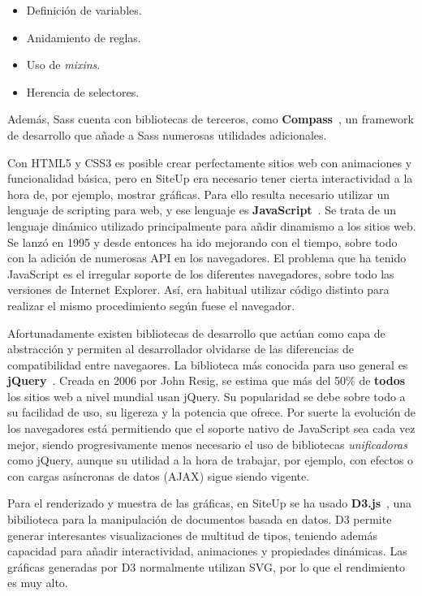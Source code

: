 \begin{itemize}
\item Definición de variables.
\item Anidamiento de reglas.
\item Uso de \textit{mixins}.
\item Herencia de selectores.
\end{itemize}

Además, Sass cuenta con bibliotecas de terceros, como
\textbf{Compass}~\cite{compass}, un framework de desarrollo que añade a Sass
numerosas utilidades adicionales.

Con HTML5 y CSS3 es posible crear perfectamente sitios web con animaciones y
funcionalidad básica, pero en SiteUp era necesario tener cierta interactividad a
la hora de, por ejemplo, mostrar gráficas. Para ello resulta necesario utilizar
un lenguaje de scripting para web, y ese lenguaje es
\textbf{JavaScript}~\cite{javascript}. Se trata de un lenguaje dinámico
utilizado principalmente para añdir dinamismo a los sitios web. Se lanzó en 1995
y desde entonces ha ido mejorando con el tiempo, sobre todo con la adición de
numerosas \ac{API} en los navegadores. El problema que ha tenido JavaScript es
el irregular soporte de los diferentes navegadores, sobre todo las versiones de
Internet Explorer. Así, era habitual utilizar código distinto para realizar el
mismo procedimiento según fuese el navegador.

Afortunadamente existen bibliotecas de desarrollo que actúan como capa de
abstracción y permiten al desarrollador olvidarse de las diferencias de
compatibilidad entre navegaores. La biblioteca más conocida para uso general es
\textbf{jQuery}~\cite{jquery}. Creada en 2006 por John Resig, se estima que más
del 50\% de \textbf{todos} los sitios web a nivel mundial usan jQuery. Su
popularidad se debe sobre todo a su facilidad de uso, su ligereza y la potencia
que ofrece. Por suerte la evolución de los navegadores está permitiendo
que el soporte nativo de JavaScript sea cada vez mejor, siendo progresivamente
menos necesario el uso de bibliotecas \textit{unificadoras} como jQuery, aunque
su utilidad a la hora de trabajar, por ejemplo, con efectos o con cargas
asíncronas de datos (\ac{AJAX}) sigue siendo vigente.

Para el renderizado y muestra de las gráficas, en SiteUp se ha usado
\textbf{D3.js}~\cite{d3}, una bibilioteca para la manipulación de documentos
basada en datos. D3 permite generar interesantes visualizaciones de multitud de
tipos, teniendo además capacidad para añadir interactividad, animaciones y
propiedades dinámicas. Las gráficas generadas por D3 normalmente utilizan
\ac{SVG}, por lo que el rendimiento es muy alto.


